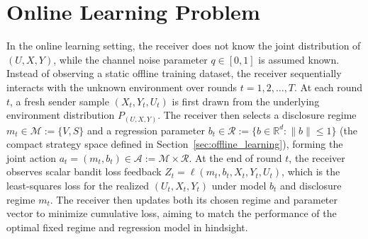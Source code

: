 \section{Online Learning Problem}
\label{sec:online_learning}

In the online learning setting, the receiver does not know the joint distribution of $(U,X,Y)$, while the channel noise parameter $q \in [0,1]$ is assumed known. Instead of observing a static offline training dataset, the receiver sequentially interacts with the unknown environment over rounds $t = 1, 2, \ldots, T$. At each round $t$, a fresh sender sample $(X_t, Y_t, U_t)$ is first drawn from the underlying environment distribution $P_{(U,X,Y)}$. The receiver then selects a disclosure regime $m_t \in \mathcal{M} := \{V, S\}$ and a regression parameter $b_t \in \mathcal{R} := \{b \in \mathbb{R}^d : \|b\| \le 1\}$ (the compact strategy space defined in Section~\ref{sec:offline_learning}), forming the joint action $a_t = (m_t, b_t) \in \mathcal{A} := \mathcal{M} \times \mathcal{R}$. At the end of round $t$, the receiver observes scalar bandit loss feedback $Z_t = \ell(m_t, b_t, X_t, Y_t, U_t)$, which is the least-squares loss for the realized $(U_t, X_t, Y_t)$ under model $b_t$ and disclosure regime $m_t$. The receiver then updates both its chosen regime and parameter vector to minimize cumulative loss, aiming to match the performance of the optimal fixed regime and regression model in hindsight.

